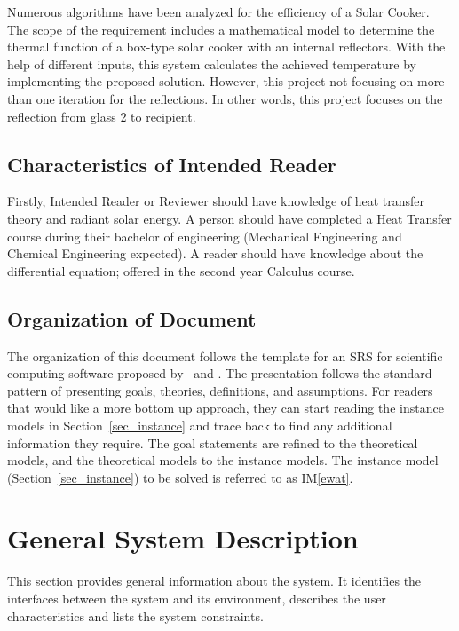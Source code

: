 \documentclass[12pt]{article}
\newcommand{\iref}[1]{IM\ref{#1}}
\begin{document}
Numerous algorithms have been analyzed for the efficiency of a Solar Cooker. The scope of the requirement includes a mathematical model to determine the thermal function of a box-type solar cooker with an internal reflectors. With the help of different inputs, this system calculates the achieved temperature by implementing the proposed solution. However, this project not focusing on more than one iteration for the reflections. In other words, this project focuses on the reflection from glass 2 to recipient.   

\subsection{Characteristics of Intended Reader} \label{sec_IntendedReader}

Firstly, Intended Reader or Reviewer should have knowledge of heat transfer theory and radiant solar energy. A person should have completed a Heat Transfer course during their bachelor of engineering (Mechanical Engineering and Chemical Engineering expected). A reader should have knowledge about the differential equation; offered in the second year Calculus course.        

\subsection{Organization of Document}

The organization of this document follows the template for an SRS for scientific 
computing software proposed by~\cite{Koothoor2013} and \cite{SmithAndLai2005}.
The presentation follows the standard pattern of presenting goals, theories, definitions, 
and assumptions. For readers that would like a more bottom up approach, they can start 
reading the instance models in Section~\ref{sec_instance} and trace back to find any 
additional information they require. The goal statements are refined to the theoretical models, 
and the theoretical models to the instance models. The instance model 
(Section~\ref{sec_instance}) to be solved is referred to as \iref{ewat}.

\section{General System Description}

This section provides general information about the system.  It identifies the
interfaces between the system and its environment, describes the user
characteristics and lists the system constraints.  
\end{document}
